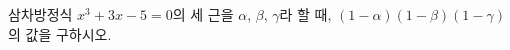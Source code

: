 삼차방정식 $x^3+3x-5=0$의 세 근을 $\alpha$, $\beta$, $\gamma$라 할 때, $(1-\alpha)(1-\beta)(1-\gamma)$의 값을 구하시오.
